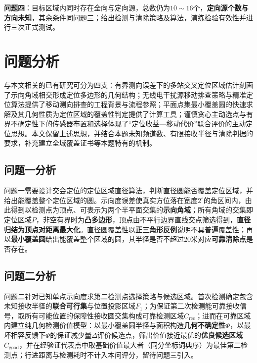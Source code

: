 \documentclass[withoutpreface]{cumcmthesis}
\begin{document}
\textbf{问题四}：目标区域内同时存在全向与定向源，总数仍为$10\sim16$个，\textbf{定向源个数与方向未知}，其余条件同问题三；给出检测与清除策略及算法，演练检验有效性并进行三次正式测试。

\section{问题分析}

与本文相关的已有研究可分为四支：有界测向误差下的多站交叉定位区域估计刻画了示向角域相交形成定位多边形的几何结构；无线电干扰源移动排查策略与精准定位算法提供了移动测向排查的工程背景与流程参照；平面点集最小覆盖圆的快速求解及其几何性质为定位区域的覆盖性判定提供了计算工具；谨慎贪心主动选点与有界不确定性下的传感器布置和选择体现了“定位收益—移动代价”联合评价的主动定位思想。本文保留上述思想，并结合本题未知频道数、有限接收半径与清除判据的要求，补充建立全域覆盖证书等本题特有的机制。

\subsection{问题一分析}

问题一需要设计交会定位的定位区域直径算法，判断直径圆能否覆盖定位区域，并给出能覆盖整个定位区域的圆。示向度误差使真实方位落在宽度$2^\circ$的角区间内，由此得到以检测点为顶点、可表示为两个半平面交集的\textbf{示向角域}；所有角域的交集即定位区域$P$，非空有界时为\textbf{凸多边形}，顶点由不平行边界直线交点筛选得到，\textbf{直径归结为顶点对距离最大化}。直径圆覆盖性以\textbf{正三角形反例}说明不具普遍覆盖性；再以\textbf{最小覆盖圆}给出能覆盖整个区域的圆，其半径是否不超过$20$米对应\textbf{可靠清除点}是否存在。

\subsection{问题二分析}

问题二针对已知单点示向度求第二检测点选择策略与候选区域。首次检测确定包含未知接收半径的\textbf{联合可行集}与位置投影区域$F_1$；为保证第二次检测能可靠接收信号，取所有可能位置的保障性接收圆交集构成可靠检测区域$C_{\mathrm{rec}}$；进而在可靠区域内建立纯几何检测价值模型：以最小覆盖圆半径与面积构造\textbf{几何不确定性$\Phi$}，以最坏相容反馈下$\Phi$的保证减少量$\Delta$评价候选点，筛出价值接近最优的\textbf{优良候选区域$C_{\mathrm{good}}$}，并在经验证代表点中取基础价值最大者（同分坐标词典序）为最佳第二检测点；行进距离与检测耗时不计入本问评分，留待问题三引入。
\end{document}
